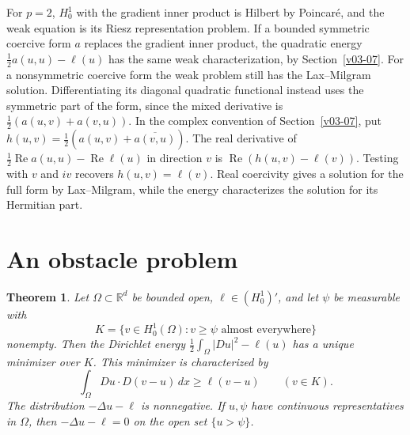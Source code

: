 \documentclass[11pt,oneside,openany]{book}
\newcommand{\R}{\mathbb R}
\theoremstyle{plain}
\newtheorem{theorem}{Theorem}[chapter]
\theoremstyle{definition}
\theoremstyle{remark}
\begin{document}
For \(p=2\), \(H^1_0\) with the gradient inner product is
Hilbert by Poincar\'e, and the weak equation is its
Riesz representation problem. If a bounded symmetric
coercive form \(a\) replaces the gradient inner product,
the quadratic energy \(\tfrac12 a(u,u)-\ell(u)\) has the
same weak characterization, by Section~\ref{v03-07}.
For a nonsymmetric coercive form the weak problem still
has the Lax--Milgram solution. Differentiating its diagonal
quadratic functional instead uses the symmetric part of the
form, since the mixed derivative is
\(\tfrac12(a(u,v)+a(v,u))\). In the complex convention of
Section~\ref{v03-07}, put
\(h(u,v)=\tfrac12(a(u,v)+\overline{a(v,u)})\).
The real derivative of
\(\tfrac12\operatorname{Re}a(u,u)-\operatorname{Re}\ell(u)\)
in direction \(v\) is \(\operatorname{Re}(h(u,v)-\ell(v))\).
Testing with \(v\) and \(iv\) recovers \(h(u,v)=\ell(v)\).
Real coercivity gives a solution for the full form by
Lax--Milgram, while the energy characterizes the solution
for its Hermitian part.

\section{An obstacle problem}
\label{v09-04}

\begin{theorem}\label{thm:hilbert-obstacle}
Let \(\Omega\subset\R^d\) be bounded open, \(\ell\in(H^1_0)'\),
and let \(\psi\) be measurable with
\[
 K=\{v\in H^1_0(\Omega):v\ge\psi\text{ almost everywhere}\}
\]
nonempty. Then the Dirichlet energy
\(\tfrac12\int_\Omega|Du|^2-\ell(u)\) has a unique minimizer
over \(K\). This minimizer is characterized by
\begin{equation}\label{eq:obstacle-vi}
 \int_\Omega Du\cdot D(v-u)\,dx\ge \ell(v-u)
 \qquad(v\in K).
\end{equation}
The distribution \(-\Delta u-\ell\) is nonnegative.
If \(u,\psi\) have continuous representatives in \(\Omega\),
then \(-\Delta u-\ell=0\) on the open set \(\{u>\psi\}\).
\end{theorem}
\end{document}
